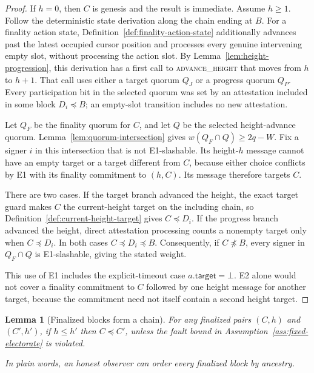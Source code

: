 \ifx\litemode\undefined\documentclass{article}\fi
\theoremstyle{plain}
\newtheorem{lemma}{Lemma}
\theoremstyle{definition}
\theoremstyle{remark}
\newcommand{\target}{\mathsf{target}}
\begin{document}
\begin{proof}
If \(h=0\), then \(C\) is genesis and the result is immediate.  Assume
\(h\geq1\).
Follow the deterministic state derivation along the chain ending at \(B\).
For a finality action state, Definition~\ref{def:finality-action-state}
additionally advances past the latest occupied cursor position and processes
every genuine intervening empty slot, without processing the action slot.  By
Lemma~\ref{lem:height-progression}, this derivation has a first call to
\textsc{advance\_height} that moves from \(h\) to \(h+1\).  That call uses
either a target quorum \(Q_J\) or a progress quorum \(Q_P\).  Every
participation bit in the selected quorum was set by an attestation included in
some block \(D_i\preceq B\); an empty-slot transition includes no new
attestation.

Let \(Q_F\) be the finality quorum for \(C\), and let \(Q\) be the selected
height-advance quorum.  Lemma~\ref{lem:quorum-intersection} gives
\(w(Q_F\cap Q)\geq2q-W\).  Fix a signer \(i\) in this intersection that is
not E1-slashable.  Its height-\(h\) message cannot have an empty target or a
target different from \(C\), because either choice conflicts by E1 with its
finality commitment to \((h,C)\).  Its message therefore targets \(C\).

There are two cases.  If the target branch advanced the height, the exact
target guard makes \(C\) the current-height target on the including chain, so
Definition~\ref{def:current-height-target} gives \(C\preceq D_i\).  If the
progress branch advanced the height, direct attestation processing counts a
nonempty target only when
\(C\preceq D_i\).  In both cases \(C\preceq D_i\preceq B\).
Consequently, if \(C\npreceq B\), every signer in \(Q_F\cap Q\) is
E1-slashable, giving the stated weight.

This use of E1 includes the explicit-timeout case \(a.\target=\bot\).
E2 alone would not cover a finality commitment to \(C\) followed by one
height message for another target, because the commitment need not itself
contain a second height target.
\end{proof}

\begin{lemma}[Finalized blocks form a chain]\label{lem:finalized-chain}
For any finalized pairs \((C,h)\) and \((C',h')\), if \(h\leq h'\) then
\(C\preceq C'\), unless the fault bound in
Assumption~\ref{ass:fixed-electorate} is violated.

In plain words, an honest observer can order every finalized block by
ancestry.
\end{lemma}
\end{document}
